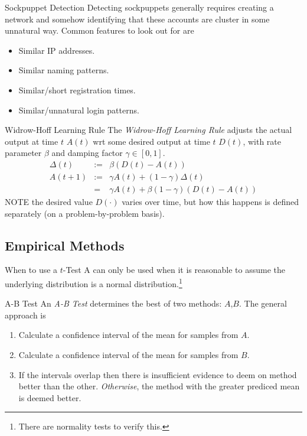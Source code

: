 \documentclass[11pt,a4paper]{article}
\begin{document}
  \begin{proposition}{Sockpuppet Detection}
    Detecting sockpuppets generally requires creating a network and somehow identifying that these accounts are cluster in some unnatural way. Common features to look out for are
    \begin{itemize}
      \item Similar IP addresses.
      \item Similar naming patterns.
      \item Similar/short registration times.
      \item Similar/unnatural login patterns.
    \end{itemize}
  \end{proposition}


  \begin{definition}{Widrow-Hoff Learning Rule}
    The \textit{Widrow-Hoff Learning Rule} adjusts the actual output at time $t$ $A(t)$ wrt some desired output at time $t$ $D(t)$, with rate parameter $\beta$ and damping factor $\gamma\in[0,1]$.
    \[\begin{array}{rrl}
      \Delta(t)&:=&\beta(D(t)-A(t))\\
      A(t+1)&:=&\gamma A(t)+(1-\gamma)\Delta(t)\\
      &=&\gamma A(t)+\beta(1-\gamma)(D(t)-A(t))
    \end{array}\]
    NOTE the desired value $D(\cdot)$ varies over time, but how this happens is defined separately (on a problem-by-problem basis).
  \end{definition}

\subsection{Empirical Methods} \label{sec_ReferenceEmpiricalMethods}

  \begin{remark}{When to use a $t$-Test}
    A  can only be used when it is reasonable to assume the underlying distribution is a normal distribution.\footnote{There are normality tests to verify this.}
  \end{remark}

  \begin{proposition}{A-B Test}
    An \textit{A-B Test} determines the best of two methods: $A$,$B$. The general approach is
    \begin{enumerate}
      \item Calculate a confidence interval of the mean for samples from $A$.
      \item Calculate a confidence interval of the mean for samples from $B$.
      \item If the intervals overlap then there is insufficient evidence to deem on method better than the other. \textit{Otherwise}, the method with the greater prediced mean is deemed better.
    \end{enumerate}
  \end{proposition}
\end{document}
